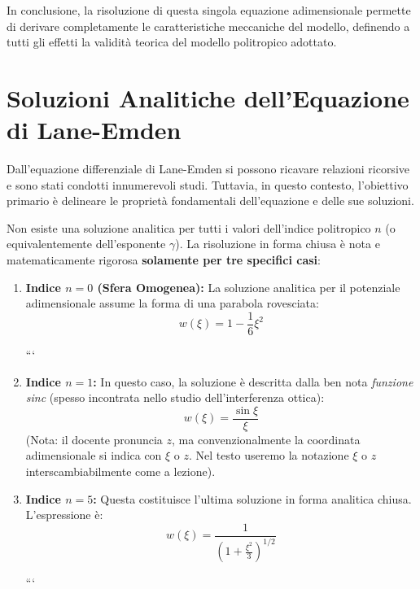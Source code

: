 In conclusione, la risoluzione di questa singola equazione adimensionale permette di derivare completamente le caratteristiche meccaniche del modello, definendo a tutti gli effetti la validità teorica del modello politropico adottato.

\section{Soluzioni Analitiche dell'Equazione di Lane-Emden}

Dall'equazione differenziale di Lane-Emden si possono ricavare relazioni ricorsive e sono stati condotti innumerevoli studi. Tuttavia, in questo contesto, l'obiettivo primario è delineare le proprietà fondamentali dell'equazione e delle sue soluzioni.

Non esiste una soluzione analitica per tutti i valori dell'indice politropico $n$ (o equivalentemente dell'esponente $\gamma$). La risoluzione in forma chiusa è nota e matematicamente rigorosa \textbf{solamente per tre specifici casi}:

\begin{enumerate}
\item \textbf{Indice $n = 0$ (Sfera Omogenea):}
La soluzione analitica per il potenziale adimensionale assume la forma di una parabola rovesciata:
\begin{equation}
w(\xi) = 1 - \frac{1}{6} \xi^2
\end{equation}

```
\item \textbf{Indice $n = 1$:} 
In questo caso, la soluzione è descritta dalla ben nota \textit{funzione sinc} (spesso incontrata nello studio dell'interferenza ottica):
\begin{equation}
    w(\xi) = \frac{\sin \xi}{\xi}
\end{equation}
(Nota: il docente pronuncia $z$, ma convenzionalmente la coordinata adimensionale si indica con $\xi$ o $z$. Nel testo useremo la notazione $\xi$ o $z$ interscambiabilmente come a lezione).

\item \textbf{Indice $n = 5$:} 
Questa costituisce l'ultima soluzione in forma analitica chiusa. L'espressione è:
\begin{equation}
    w(\xi) = \frac{1}{\left( 1 + \frac{\xi^2}{3} \right)^{1/2}}
\end{equation}

```

\end{enumerate}

